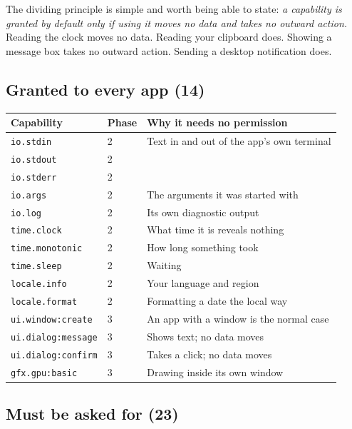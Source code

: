 \documentclass[11pt,a4paper]{report}
\begin{document}
The dividing principle is simple and worth being able to state: \emph{a
capability is granted by default only if using it moves no data and takes
no outward action.} Reading the clock moves no data. Reading your clipboard
does. Showing a message box takes no outward action. Sending a desktop
notification does.

\subsection{Granted to every app (14)}

\begin{center}
\begin{tabular}{llp{6.6cm}}
\toprule
\textbf{Capability} & \textbf{Phase} & \textbf{Why it needs no permission} \\
\midrule
\texttt{io.stdin} & 2 & Text in and out of the app's own terminal \\
\texttt{io.stdout} & 2 & \\
\texttt{io.stderr} & 2 & \\
\texttt{io.args} & 2 & The arguments it was started with \\
\texttt{io.log} & 2 & Its own diagnostic output \\
\texttt{time.clock} & 2 & What time it is reveals nothing \\
\texttt{time.monotonic} & 2 & How long something took \\
\texttt{time.sleep} & 2 & Waiting \\
\texttt{locale.info} & 2 & Your language and region \\
\texttt{locale.format} & 2 & Formatting a date the local way \\
\texttt{ui.window:create} & 3 & An app with a window is the normal case \\
\texttt{ui.dialog:message} & 3 & Shows text; no data moves \\
\texttt{ui.dialog:confirm} & 3 & Takes a click; no data moves \\
\texttt{gfx.gpu:basic} & 3 & Drawing inside its own window \\
\bottomrule
\end{tabular}
\end{center}

\subsection{Must be asked for (23)}
\end{document}
